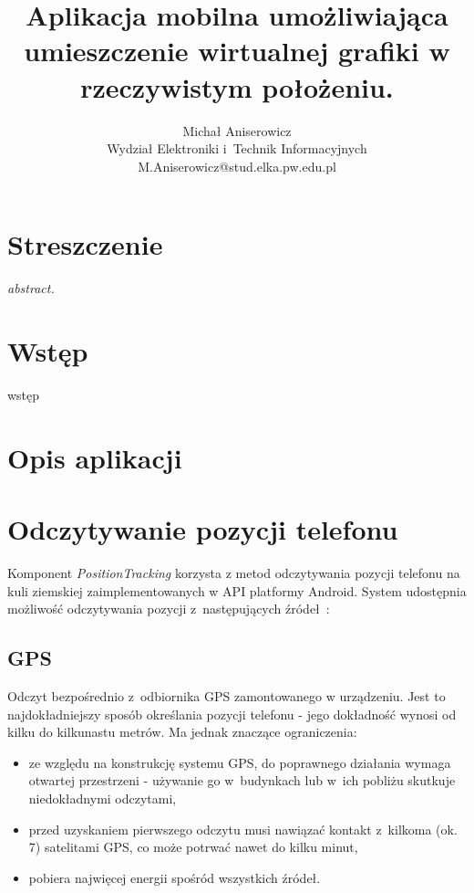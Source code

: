 \documentclass[a4paper,twocolumn,11pt]{article}
\title{{\mycfsb{14} Aplikacja mobilna umożliwiająca umieszczenie wirtualnej grafiki w rzeczywistym położeniu.}}
\author{{\mycfs{12} Michał Aniserowicz} \\ {\mycfs{11} Wydział Elektroniki i~Technik Informacyjnych} \\ {\mycfs{11} M.Aniserowicz@stud.elka.pw.edu.pl}}
\date{}
\begin{document}
\vspace{1.5cm}

\maketitle

\section*{Streszczenie}

\emph{abstract.}

\section{Wstęp}

wstęp

\section{Opis aplikacji}



\section{Odczytywanie pozycji telefonu}

Komponent \emph{PositionTracking} korzysta z metod odczytywania pozycji telefonu na kuli ziemskiej zaimplementowanych w API platformy Android.
System udostępnia możliwość odczytywania pozycji z~następujących źródeł~\cite{and:loc}:

\subsection{GPS}
 Odczyt bezpośrednio z~odbiornika GPS zamontowanego w urządzeniu.
 Jest to najdokładniejszy sposób określania pozycji telefonu - jego dokładność wynosi od kilku do kilkunastu metrów.
 Ma jednak znaczące ograniczenia:
 \begin{itemize}
  \item ze względu na konstrukcję systemu GPS, do poprawnego działania wymaga otwartej przestrzeni - używanie go w~budynkach lub w~ich pobliżu skutkuje niedokładnymi odczytami,
  \item przed uzyskaniem pierwszego odczytu musi nawiązać kontakt z~kilkoma (ok. 7) satelitami GPS, co może potrwać nawet do kilku minut,
  \item pobiera najwięcej energii spośród wszystkich źródeł.
 \end{itemize}
\end{document}
